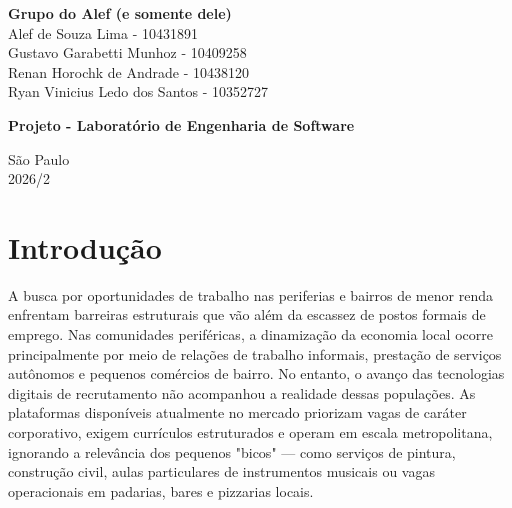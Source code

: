 \documentclass[
    12pt,
    oneside,
    a4paper,
    brazil
]{abntex2}
\begin{document}

\begin{center}

\textbf{Grupo do Alef (e somente dele)} \\

Alef de Souza Lima - 10431891 \\
Gustavo Garabetti Munhoz - 10409258 \\
Renan Horochk de Andrade - 10438120 \\
Ryan Vinicius Ledo dos Santos - 10352727

\end{center}

\vfill

\begin{center}
    {\Large\textbf{Projeto - Laboratório de Engenharia de Software}}
\end{center}

\vfill

\begin{center}
    São Paulo \\
    2026/2
\end{center}

\newpage


\tableofcontents*

\newpage


\textual


\chapter{Introdução}

A busca por oportunidades de trabalho nas periferias e bairros de menor renda enfrentam barreiras estruturais que vão além da escassez de postos formais de emprego. Nas comunidades periféricas, a dinamização da economia local ocorre principalmente por meio de relações de trabalho informais, prestação de serviços autônomos e pequenos comércios de bairro. No entanto, o avanço das tecnologias digitais de recrutamento não acompanhou a realidade dessas populações. As plataformas disponíveis atualmente no mercado priorizam vagas de caráter corporativo, exigem currículos estruturados e operam em escala metropolitana, ignorando a relevância dos pequenos "bicos" — como serviços de pintura, construção civil, aulas particulares de instrumentos musicais ou vagas operacionais em padarias, bares e pizzarias locais.
\end{document}
